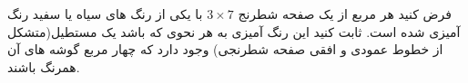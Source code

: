 \exercise
فرض کنید هر مربع از یک صفحه شطرنج 
$3\times7$
با یکی از رنگ های سیاه یا سفید رنگ آمیزی شده است. ثابت کنید این رنگ آمیزی به هر نحوی که باشد یک مستطیل(متشکل از خطوط عمودی و افقی صفحه شطرنجی) وجود دارد که چهار مربع گوشه های آن همرنگ باشند.